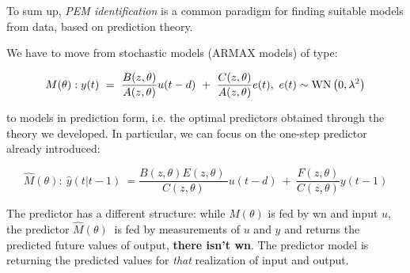 

To sum up, \textit{PEM identification} is a common paradigm for finding suitable models from data, based on prediction theory.

We have to move from stochastic models (ARMAX models) of type: 

$$
M(\theta):
y( t) \ =\ \frac{B( z,\theta )}{A( z,\theta )} u( t-d) \ +\ \frac{C( z,\theta )}{A( z,\theta )} e( t) ,\ e( t)\sim \operatorname{WN} \left( 0,\lambda ^{2}\right)
$$

to models in prediction form, i.e. the optimal predictors obtained through the theory we developed. In particular, we can focus on the one-step predictor already introduced:

$$
\hat{M}( \theta ) :
\ \hat{y}( t|t-1) \ =\frac{B( z,\theta ) E( z,\theta ) \ }{C( z,\theta )} u( t-d) \ +\ \frac{F( z,\theta )}{C( z,\theta )} y( t-1)
$$

The predictor has a different structure: while $ M( \theta )$ is fed by \gls{wn} and input $ u$, the predictor $ \hat{M}( \theta ) \ $ is fed by measurements of $ u$ and $ y$ and returns the predicted future values of output, \textbf{there isn't \gls{wn}}. The predictor model is returning the predicted values for \textit{that} realization of input and output.



